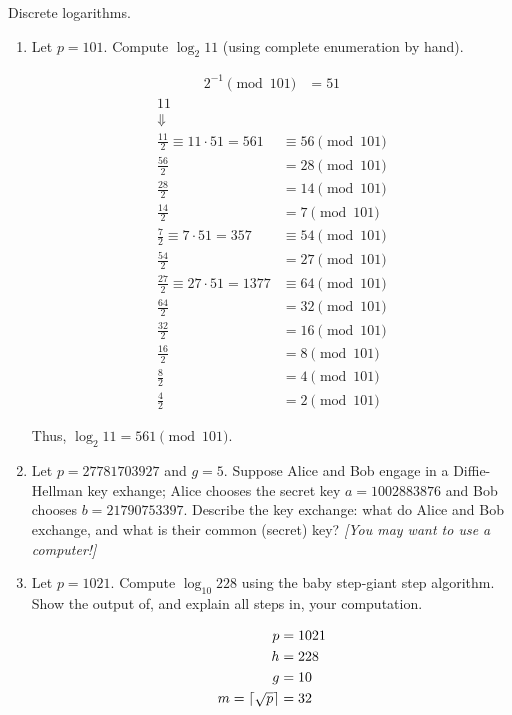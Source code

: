 \begin{problem}
  Discrete logarithms.
  \begin{enumerate}\renewcommand{\itemsep}{3mm}
    \item Let $p=101$.  Compute $\log_2 11$ (using complete enumeration by hand).
      \begin{Answer}
        \begin{align*}
          {2}^{-1} \pmod{101} &= 51
        \end{align*}
        \begin{align}
          11\\
          \nonumber \Downarrow\\
          \frac{11}{2} \equiv 11 \cdot 51 = 561 &\equiv 56 \pmod{101} \\
          \frac{56}{2} &= 28 \pmod{101} \\
          \frac{28}{2} &= 14 \pmod{101} \\
          \frac{14}{2} &= 7 \pmod{101} \\
          \frac{7}{2} \equiv 7 \cdot 51 = 357 &\equiv 54 \pmod{101} \\
          \frac{54}{2} &= 27 \pmod{101} \\
          \frac{27}{2} \equiv 27 \cdot 51 = 1377 &\equiv 64 \pmod{101} \\
          \frac{64}{2} &= 32 \pmod{101} \\
          \frac{32}{2} &= 16 \pmod{101} \\
          \frac{16}{2} &= 8 \pmod{101} \\
          \frac{8}{2} &= 4 \pmod{101} \\
          \frac{4}{2} &= 2 \pmod{101}
        \end{align}

        \noindent
        Thus, $\log_2 11 = 561 \pmod{101}$.
      \end{Answer}
    
    \item Let $p=27781703927$ and $g=5$.  Suppose Alice and Bob engage in
    a Diffie-Hellman key exhange; Alice chooses the secret key
    $a=1002883876$ and Bob chooses $b=21790753397$.  Describe the key
    exchange: what do Alice and Bob exchange, and what is their common
    (secret) key?  \emph{[You may want to use a computer!]}
    
    \item Let $p = 1021$.  Compute $\log_{10} 228$ using the baby step-giant
    step algorithm. Show the output of, and explain all steps in, your computation.
    \begin{Answer}
      \begin{multicols*}{2}
        \begin{align*}
          p &= 1021 \\
          h &= 228 \\
          g &= 10 \\
          m = \lceil{} \sqrt{p} \rceil &= 32 \\
        \end{align*}
        \noindent


\end{multicols*}
\end{Answer}
\end{enumerate}
\end{problem}
